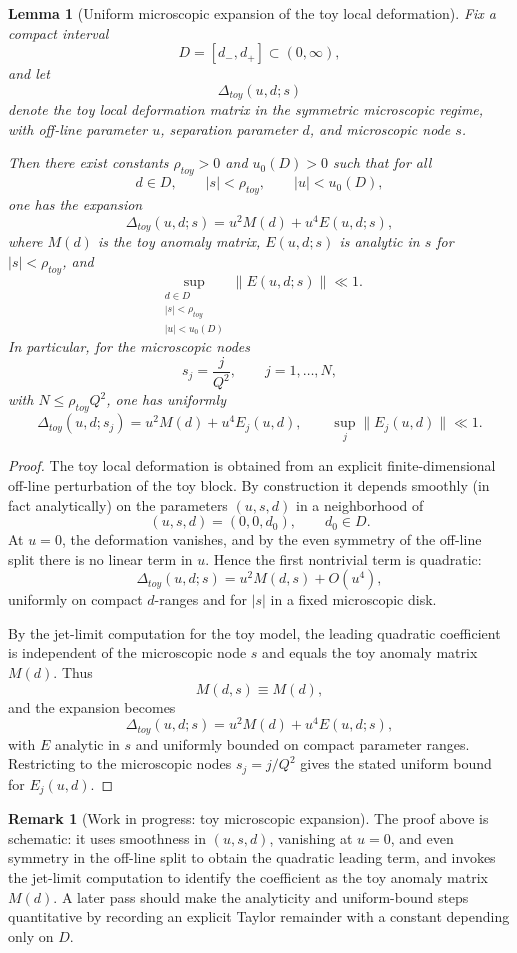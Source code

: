 \documentclass[11pt,a4paper]{amsart}
\def\toy{toy}%
\theoremstyle{plain}
\newtheorem{lemma}[theorem]{Lemma}
\theoremstyle{definition}
\newtheorem{remark}[theorem]{Remark}
\newcommand{\toy}{\mathrm{toy}}
\begin{document}
\begin{lemma}[Uniform microscopic expansion of the toy local deformation]
\label{lem:toy-microscopic-expansion}
Fix a compact interval
\[
D=[d_-,d_+]\subset(0,\infty),
\]
and let
\[
\Delta_{\toy}(u,d;s)
\]
denote the toy local deformation matrix in the symmetric microscopic regime,
with off-line parameter $u$, separation parameter $d$, and microscopic node
$s$.

Then there exist constants $\rho_{\toy}>0$ and $u_0(D)>0$ such that for all
\[
d\in D,
\qquad
|s|<\rho_{\toy},
\qquad
|u|<u_0(D),
\]
one has the expansion
\[
\Delta_{\toy}(u,d;s)=u^2M(d)+u^4E(u,d;s),
\]
where $M(d)$ is the toy anomaly matrix, $E(u,d;s)$ is analytic in $s$
for $|s|<\rho_{\toy}$, and
\[
\sup_{\substack{d\in D\\ |s|<\rho_{\toy}\\ |u|<u_0(D)}} \|E(u,d;s)\|\ll 1.
\]
In particular, for the microscopic nodes
\[
s_j=\frac{j}{Q^2},
\qquad
j=1,\dots,N,
\]
with $N\le \rho_{\toy}Q^2$, one has uniformly
\[
\Delta_{\toy}(u,d;s_j)=u^2M(d)+u^4E_j(u,d),
\qquad
\sup_j \|E_j(u,d)\|\ll 1.
\]
\end{lemma}

\begin{proof}
The toy local deformation is obtained from an explicit finite-dimensional
off-line perturbation of the toy block. By construction it depends smoothly
(in fact analytically) on the parameters $(u,s,d)$ in a neighborhood of
\[
(u,s,d)=(0,0,d_0),
\qquad d_0\in D.
\]
At $u=0$, the deformation vanishes, and by the even symmetry of the off-line
split there is no linear term in $u$. Hence the first nontrivial term is
quadratic:
\[
\Delta_{\toy}(u,d;s)=u^2M(d,s)+O(u^4),
\]
uniformly on compact $d$-ranges and for $|s|$ in a fixed microscopic disk.

By the jet-limit computation for the toy model, the leading quadratic
coefficient is independent of the microscopic node $s$ and equals the toy
anomaly matrix $M(d)$. Thus
\[
M(d,s)\equiv M(d),
\]
and the expansion becomes
\[
\Delta_{\toy}(u,d;s)=u^2M(d)+u^4E(u,d;s),
\]
with $E$ analytic in $s$ and uniformly bounded on compact parameter
ranges. Restricting to the microscopic nodes $s_j=j/Q^2$ gives the stated
uniform bound for $E_j(u,d)$.
\end{proof}

\begin{remark}[Work in progress: toy microscopic expansion]
\label{rem:wip-toy-microscopic-expansion}
The proof above is schematic: it uses smoothness in $(u,s,d)$, vanishing at
$u=0$, and even symmetry in the off-line split to obtain the quadratic
leading term, and invokes the jet-limit computation to identify the
coefficient as the toy anomaly matrix $M(d)$. A later pass should make the
analyticity and uniform-bound steps quantitative by recording an explicit
Taylor remainder with a constant depending only on $D$.
\end{remark}
\end{document}
